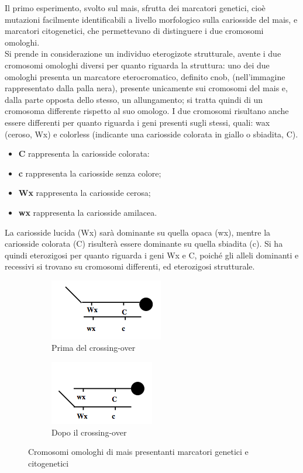 \documentclass[11pt]{book}
\begin{document}
Il primo esperimento, svolto sul mais, sfrutta dei marcatori genetici, cioè mutazioni facilmente identificabili a livello morfologico sulla cariosside del mais, e marcatori citogenetici, che permettevano di distinguere i due cromosomi omologhi.\\
Si prende in considerazione un individuo eterogizote strutturale, avente i due cromosomi omologhi diversi per quanto riguarda la struttura: uno dei due omologhi presenta un marcatore eterocromatico, definito cnob, (nell’immagine rappresentato dalla palla nera), presente unicamente sui cromosomi del mais e, dalla parte opposta dello stesso, un allungamento; si tratta quindi di un cromosoma differente rispetto al suo omologo. 
I due cromosomi risultano anche essere differenti per quanto riguarda i geni presenti sugli stessi, quali: wax (ceroso, Wx) e colorless (indicante una cariosside colorata in giallo o sbiadita, C).

\begin{itemize}
\item  
\textbf{C} rappresenta la cariosside colorata:
\item
\textbf{c} rappresenta la cariosside senza colore;
\item
\textbf{Wx} rappresenta la cariosside cerosa;
\item
\textbf{wx} rappresenta la cariosside amilacea.
\end{itemize}

La cariosside lucida (Wx) sarà dominante su quella opaca (wx), mentre la cariosside colorata (C) risulterà essere dominante su quella sbiadita (c). 
Si ha quindi eterozigosi per quanto riguarda i geni Wx e C, poiché gli alleli dominanti e recessivi si trovano su cromosomi differenti, ed eterozigosi strutturale.

\clearpage
\begin{figure}
\centering
\begin{subfigure}{.5\textwidth}
  \centering
  \includegraphics[width=.4\linewidth]{./img/01_cromosomiMais.png}
  \caption{Prima del crossing-over}
  \label{fig:sub1}
\end{subfigure}%
\begin{subfigure}{.5\textwidth}
  \centering
  \includegraphics[width=.4\linewidth]{./img/02_crossingoverMais.png}
  \caption{Dopo il crossing-over}
  \label{fig:sub2}
\end{subfigure}
\caption{Cromosomi omologhi di mais presentanti marcatori genetici e citogenetici}
\label{fig:test}
\end{figure}
\end{document}
